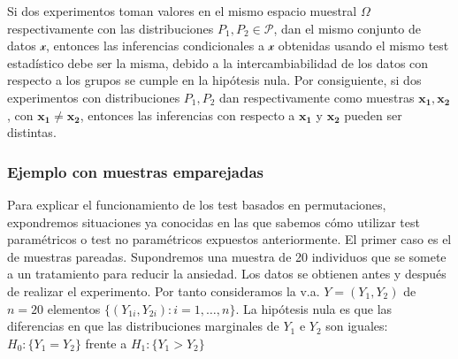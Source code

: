 \begin{definicion}
	Si dos experimentos toman valores en el mismo espacio muestral $\Omega$ respectivamente con las distribuciones $P_1, P_2 \in \mathcal{P}$, dan el mismo conjunto de datos $\mathcal{x}$, entonces las inferencias condicionales a $\mathcal{x}$ obtenidas usando el mismo test estadístico debe ser la misma, debido a la intercambiabilidad de los datos con respecto a los grupos se cumple en la hipótesis nula. Por consiguiente, si dos experimentos con distribuciones $P_1, P_2$ dan respectivamente como muestras $\mathbf{x_1}, \mathbf{x_2}$, con $\mathbf{x_1} \neq \mathbf{x_2}$, entonces las inferencias con respecto a $\mathbf{x_1}$ y $\mathbf{x_2}$ pueden ser distintas.
\end{definicion}


\subsubsection{Ejemplo con muestras emparejadas}

	Para explicar el funcionamiento de los test basados en permutaciones, expondremos situaciones ya conocidas en las que sabemos cómo utilizar test paramétricos o test no paramétricos expuestos anteriormente. El primer caso es el de muestras pareadas. Supondremos una muestra de 20 individuos que se somete a un tratamiento para reducir la ansiedad. Los datos se obtienen antes y después de realizar el experimento. Por tanto consideramos la v.a. $Y = (Y_1, Y_2)$ de $n=20$ elementos $\{(Y_{1i},Y_{2i}): i = 1, \dots, n\}$. La hipótesis nula es que las diferencias en que las distribuciones marginales de $Y_1$ e $Y_2$ son iguales: $H_0 : \{ Y_1 = Y_2 \}$ frente a $H_1: \{ Y_1 > Y_2 \}$\\
	
